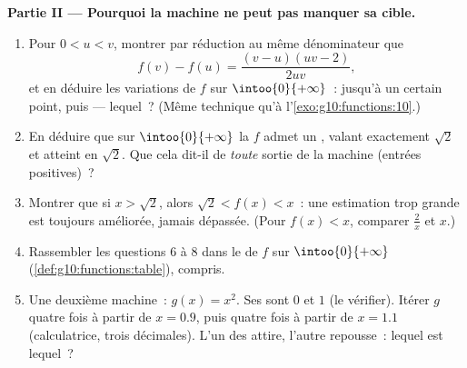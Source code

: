 \begin{problem}
\medskip
\noindent\textbf{Partie II --- Pourquoi la machine ne peut pas
manquer sa cible.}
\begin{enumerate}[resume]
  \item Pour $0 < u < v$, montrer par réduction au même dénominateur
        que
        \[
        f(v) - f(u) = \frac{(v - u)(uv - 2)}{2uv} ,
        \]
        et en déduire les variations de $f$ sur
        $\intoo{0}{+\infty}$~:  jusqu'à un certain point,
        puis  --- lequel~? (Même technique qu'à
        l'\cref{exo:g10:functions:10}.)
  \item En déduire que sur $\intoo{0}{+\infty}$ la  $f$
        admet un , valant exactement $\sqrt2$ et atteint en
        $\sqrt2$. Que cela dit-il de \emph{toute} sortie de la
        machine (entrées positives)~?
  \item Montrer que si $x > \sqrt2$, alors $\sqrt2 < f(x) < x$~: une
        estimation trop grande est toujours améliorée, jamais
        dépassée. (Pour $f(x) < x$, comparer $\frac2x$ et $x$.)
  \item Rassembler les questions 6 à 8 dans le 
        de $f$ sur $\intoo{0}{+\infty}$
        (\cref{def:g10:functions:table}),  compris.
  \item Une deuxième machine~: $g(x) = x^2$. Ses  sont
        $0$ et $1$ (le vérifier). Itérer $g$ quatre fois à partir de
        $x = 0.9$, puis quatre fois à partir de $x = 1.1$
        (calculatrice, trois décimales). L'un des 
        attire, l'autre repousse~: lequel est lequel~?
\end{enumerate}


\end{problem}
